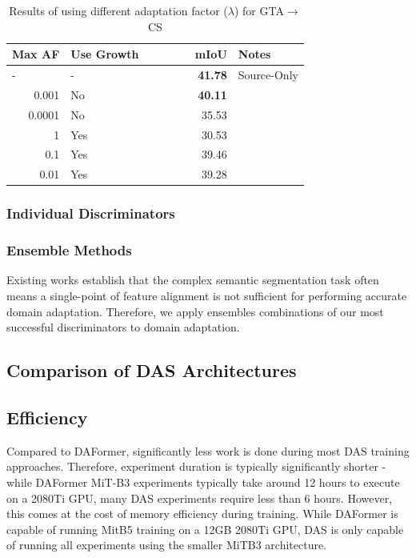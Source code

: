 \documentclass[a4paper,12pt]{report}
\begin{document}
\begin{table}[]
    \centering
    \begin{tabular}{|r|l|r|l|}
        \hline
        \multicolumn{1}{|l|}{Max AF} & Use Growth & \multicolumn{1}{l|}{\ \ \ \ \ \ \ mIoU} & Notes       \\ \hline
        \multicolumn{1}{|l|}{-}      & -          & \textbf{41.78}                          & Source-Only \\ \hline
        0.001                        & No         & \textbf{40.11}                          &             \\ \hline
        0.0001                       & No         & 35.53                                   &             \\ \hline
        1                            & Yes        & 30.53                                   &             \\ \hline
        0.1                          & Yes        & 39.46                                   &             \\ \hline
        0.01                         & Yes        & 39.28                                   &             \\ \hline
    \end{tabular}
    \caption{Results of using different adaptation factor ($\lambda$) for GTA$\rightarrow$CS}
\end{table}

\subsubsection{Individual Discriminators}


\subsubsection{Ensemble Methods}
Existing works \cite{chen_learning_2017} \cite{csurka_unsupervised_2021} \cite{ronneberger_u-net_2015} establish that the complex semantic segmentation task often means a single-point of feature alignment is not sufficient for performing accurate domain adaptation. Therefore, we apply ensembles combinations of our most successful discriminators to domain adaptation.

\subsection{Comparison of DAS Architectures}
\subsection{Efficiency}
Compared to DAFormer, significantly less work is done during most DAS training approaches. Therefore, experiment duration is typically significantly shorter - while DAFormer MiT-B3 experiments typically take around 12 hours to execute on a 2080Ti GPU, many DAS experiments require less than 6 hours. However, this comes at the cost of memory efficiency during training. While DAFormer is capable of running MitB5 training on a 12GB 2080Ti GPU, DAS is only capable of running all experiments using the smaller MiTB3 architecture.
\end{document}
